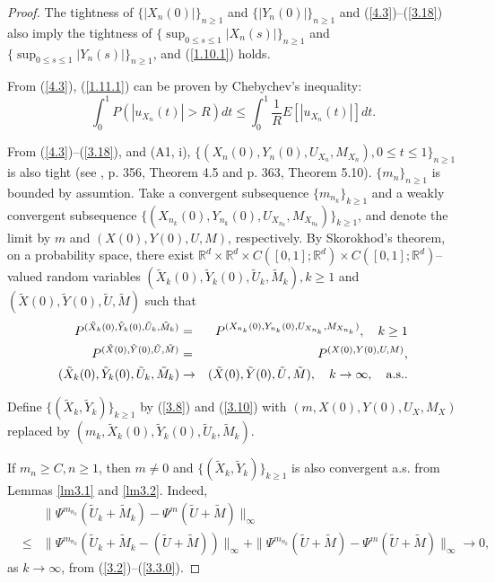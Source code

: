 \documentclass[12pt]{article}
\begin{document}
\begin{proof}
The tightness of $\{|X_n(0)|\}_{n\ge 1}$ and $\{|Y_n(0)|\}_{n\ge 1}$ and  (\ref{4.3})--(\ref{3.18}) 
also imply the tightness of $\{\sup_{0\le s\le 1} |X_n(s)|\}_{n\ge 1}$ and
$\{\sup_{0\le s\le 1} |Y_n(s)|\}_{n\ge 1}$, and  (\ref{1.10.1}) holds.

From (\ref{4.3}), (\ref{1.11.1}) can be proven by Chebychev's inequality:
$$\int_0^1 P(|u_{X_n}(t)|> R)dt
\le \int_0^1\frac{1}{R}E[|u_{X_n}(t)|]dt.
$$

From (\ref{4.3})--(\ref{3.18}), and (A1, i), 
$\{( X_n(0),Y_n(0), U_{X_n},M_{X_n}),0\le t\le 1\}_{n\ge 1}$ is also tight %
 (see \cite{2-JS}, p. 356, Theorem 4.5 and p. 363, Theorem 5.10).
 $\{m_n\}_{n\ge 1}$ is  bounded by assumtion.
Take a convergent subsequence $\{m_{n_k}\}_{k\ge 1}$ and a weakly convergent subsequence 
$\{(X_{n_k}(0), Y_{n_k}(0), U_{X_{n_k}},M_{X_{n_k}})\}_{k\ge 1}$,
and denote the limit by $m$ and  $(X(0), Y(0),U,M)$, respectively.
By Skorokhod's theorem, on a probability space, 
there exist $\mathbb{R}^d\times\mathbb{R}^d\times C([0,1];\mathbb{R}^d)\times C([0,1];\mathbb{R}^d)$--valued random variables $(\tilde X_{k}(0), \tilde Y_{k}(0), \tilde U_{k},\tilde M_{k}), k\ge 1$ and
$(\tilde X(0), \tilde Y(0),\tilde U,\tilde M)$ such that
\begin{eqnarray*}
P^{(\tilde X_{k}(0), \tilde Y_{k}(0), \tilde U_{k},\tilde M_{k})}&=&
P^{(X_{n_k}(0), Y_{n_k}(0), U_{X_{n_k}},M_{X_{n_k}})},\quad k\ge 1\\
P^{(\tilde X(0), \tilde Y(0),\tilde U,\tilde M)}&=&P^{(X(0), Y(0),U,M)},\\
(\tilde X_{k}(0), \tilde Y_{k}(0), \tilde U_{k},\tilde M_{k}) &\to& (\tilde X(0), \tilde Y(0),\tilde U,\tilde M),\quad k\to\infty, \quad {\rm a.s..}
\end{eqnarray*}

Define $\{(\tilde X_{k},\tilde Y_{k})\}_{k\ge 1}$ by (\ref{3.8}) and (\ref{3.10})
with $(m,X(0), Y(0), U_{X},M_{X})$ replaced by $(m_k,\tilde X_{k}(0), \tilde Y_{k}(0), \tilde U_{k},\tilde M_{k})$.

If  $m_n\ge C, n\ge 1$, then 
$m\ne 0$ and $\{(\tilde X_{k},\tilde Y_{k})\}_{k\ge 1}$ is also convergent a.s. from Lemmas \ref{lm3.1}  and \ref{lm3.2}.
Indeed, 
\begin{eqnarray*}
&&\|\Psi^{m_{n_k}}(\tilde U_{k}+\tilde M_{k})-\Psi^{m}(\tilde U+\tilde M)\|_\infty\\
& \le& \|\Psi^{m_{n_k}}(\tilde U_{k}+\tilde M_{k}-(\tilde U+\tilde M))\|_\infty+
\|\Psi^{m_{n_k}}(\tilde U+\tilde M)-\Psi^{m}(\tilde U+\tilde M)\|_\infty\to 0,
\end{eqnarray*}
as $k\to\infty$,
from (\ref{3.2})--(\ref{3.3.0}).


\end{proof}
\end{document}
